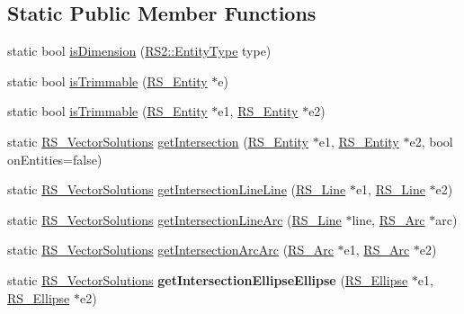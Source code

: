 \subsection*{Static Public Member Functions}
\begin{DoxyCompactItemize}
\item 
static bool \hyperlink{classRS__Information_a4ae006c6261e540a3e094d79329d031a}{is\-Dimension} (\hyperlink{classRS2_a8f26d1b981e1e85cff16738b43337e6a}{R\-S2\-::\-Entity\-Type} type)
\item 
static bool \hyperlink{classRS__Information_a54b779dbf677839b49ae94051429e191}{is\-Trimmable} (\hyperlink{classRS__Entity}{R\-S\-\_\-\-Entity} $\ast$e)
\item 
static bool \hyperlink{classRS__Information_ab5639e539443c3a7119180c961c8b8e6}{is\-Trimmable} (\hyperlink{classRS__Entity}{R\-S\-\_\-\-Entity} $\ast$e1, \hyperlink{classRS__Entity}{R\-S\-\_\-\-Entity} $\ast$e2)
\item 
static \hyperlink{classRS__VectorSolutions}{R\-S\-\_\-\-Vector\-Solutions} \hyperlink{classRS__Information_af800c2fc40442c9dc3823a26393741e4}{get\-Intersection} (\hyperlink{classRS__Entity}{R\-S\-\_\-\-Entity} $\ast$e1, \hyperlink{classRS__Entity}{R\-S\-\_\-\-Entity} $\ast$e2, bool on\-Entities=false)
\item 
static \hyperlink{classRS__VectorSolutions}{R\-S\-\_\-\-Vector\-Solutions} \hyperlink{classRS__Information_acf067ec9822ee209484176c882558182}{get\-Intersection\-Line\-Line} (\hyperlink{classRS__Line}{R\-S\-\_\-\-Line} $\ast$e1, \hyperlink{classRS__Line}{R\-S\-\_\-\-Line} $\ast$e2)
\item 
static \hyperlink{classRS__VectorSolutions}{R\-S\-\_\-\-Vector\-Solutions} \hyperlink{classRS__Information_af8076e33fda55f3f0ef55773c4282f73}{get\-Intersection\-Line\-Arc} (\hyperlink{classRS__Line}{R\-S\-\_\-\-Line} $\ast$line, \hyperlink{classRS__Arc}{R\-S\-\_\-\-Arc} $\ast$arc)
\item 
static \hyperlink{classRS__VectorSolutions}{R\-S\-\_\-\-Vector\-Solutions} \hyperlink{classRS__Information_a6f23afa351e5e5e8bc906c23f884b8c3}{get\-Intersection\-Arc\-Arc} (\hyperlink{classRS__Arc}{R\-S\-\_\-\-Arc} $\ast$e1, \hyperlink{classRS__Arc}{R\-S\-\_\-\-Arc} $\ast$e2)
\item 
\hypertarget{classRS__Information_a08ac773c3b934353df901ae379cc69c2}{static \hyperlink{classRS__VectorSolutions}{R\-S\-\_\-\-Vector\-Solutions} {\bfseries get\-Intersection\-Ellipse\-Ellipse} (\hyperlink{classRS__Ellipse}{R\-S\-\_\-\-Ellipse} $\ast$e1, \hyperlink{classRS__Ellipse}{R\-S\-\_\-\-Ellipse} $\ast$e2)}\label{classRS__Information_a08ac773c3b934353df901ae379cc69c2}


\end{DoxyCompactItemize}
